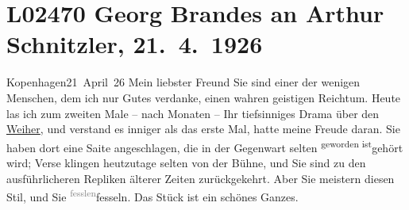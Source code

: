 

\section[Georg Brandes an Arthur Schnitzler, 21. 4. 1926]{L02470 Georg Brandes an Arthur Schnitzler, 21. 4. 1926}
\nopagebreak{}
\rehead{ }\normalsize\beginnumbering{}
\toendnotes[C]{\smallbreak\pagebreak[2]}
\toendnotes[C]{\smallbreak}
\pstart
           \raggedleft{}{\pb}Kopenhagen21 April 26\pend
           \vspace{0.5em}
\pstart
           Mein liebster Freund Sie sind einer der wenigen Menschen, dem ich
               nur Gutes verdanke, einen wahren geistigen Reichtum. Heute las ich zum zweiten Male –
               nach Monaten – Ihr tiefsinniges Drama über den \uline{Weiher}, und verstand es inniger als das erste Mal, hatte meine Freude daran. Sie haben
               dort eine Saite angeschlagen, die in der Gegenwart selten \substVorne{}\textsuperscript{geworden ist}\substDazwischen{}gehört wird\substHinten{}; Verse klingen heutzutage selten von der Bühne, und Sie sind zu den
               ausführlicheren Repliken älterer Zeiten zurückgekehrt. Aber Sie meistern diesen Stil,
               und Sie \substVorne{}\textsuperscript{\textcolor{gray}{fesslen}}\substDazwischen{}fesseln\substHinten{}. Das Stück ist ein
               schönes Ganzes.\pend
           

